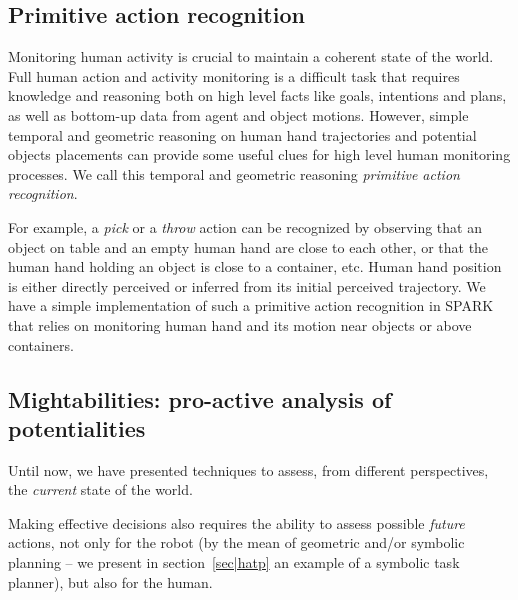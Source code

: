 \documentclass{svmult}
\newcommand{\concept}[1]{{\footnotesize \texttt{#1}}}
\begin{document}

\subsection{Primitive action recognition}
\label{sec|primitives}

Monitoring human activity is crucial to maintain a coherent state of the world.
Full human action and activity monitoring is a difficult task that requires
knowledge and reasoning both on high level facts like goals, intentions and
plans, as well as bottom-up data from agent and object motions. However, simple
temporal and geometric reasoning on human hand trajectories and potential
objects placements can provide some useful clues for high level human
monitoring processes. We call this temporal and geometric reasoning
\emph{primitive action recognition}.

For example, a \emph{pick} or a \emph{throw} action can be
recognized by observing that an object on table and an empty human hand are
close to each other, or that the human hand holding an object is close to a
container, etc. Human hand position is either directly perceived or inferred
from its initial perceived trajectory.  We have a simple implementation of such
a primitive action recognition in SPARK that relies on monitoring human hand
and its motion near objects or above containers.



\subsection{Mightabilities: pro-active analysis of potentialities}

Until now, we have presented techniques to assess, from different perspectives,
the \emph{current} state of the world.

Making effective decisions also requires the ability to assess possible \emph{future}
actions, not only for the robot (by the mean of geometric and/or symbolic planning --
we present in section~\ref{sec|hatp} an example of a symbolic task planner), but
also for the human.
\end{document}
